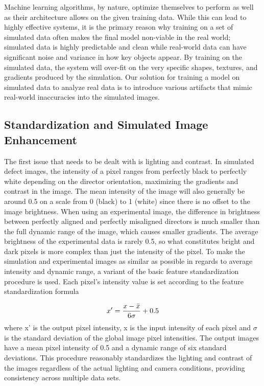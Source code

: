 \documentclass[prl,reprint,showpacs,floatfix,nofootinbib]{revtex4-1}
\begin{document}
Machine learning algorithms, by nature, optimize themselves to perform as well as their architecture allows on the given training data. While this can lead to highly effective systems, it is the primary reason why training on a set of simulated data often makes the final model non-viable in the real world; simulated data is highly predictable and clean while real-world data can have significant noise and variance in how key objects appear. By training on the simulated data, the system will over-fit\cite{lawrence_lessons_1997} \cite{lever_model_2016} on the very specific shapes, textures, and gradients produced by the simulation. %
Our solution for training a model on simulated data to analyze real data is to introduce various artifacts that mimic real-world inaccuracies into the simulated images.

\subsection{Standardization and Simulated Image Enhancement}

The first issue that needs to be dealt with is lighting and contrast. In simulated defect images, the intensity of a pixel ranges from perfectly black to perfectly white depending on the director orientation, maximizing the gradients and contrast in the image. The mean intensity of the image will also generally be around 0.5 on a scale from 0 (black) to 1 (white) since there is no offset to the image brightness. When using an experimental image, the difference in brightness between perfectly aligned and perfectly misaligned directors is much smaller than the full dynamic range of the image, which causes smaller gradients. The average brightness of the experimental data is rarely 0.5, so what constitutes bright and dark pixels is more complex than just the intensity of the pixel. To make the simulation and experimental images as similar as possible in regards to average intensity and dynamic range, a variant of the basic feature standardization procedure\cite{aksoy_feature_2001} is used. Each pixel's intensity value is set according to the feature standardization formula

\begin{equation}
 x' = \frac{x - \Bar{x}}{6\sigma} +0.5
\end{equation}
where x' is the output pixel intensity, x is the input intensity of each pixel and $\sigma$ is the standard deviation of the global image pixel intensities. The output images have a mean pixel intensity of 0.5 and a dynamic range of six standard deviations. This procedure reasonably standardizes the lighting and contrast of the images regardless of the actual lighting and camera conditions, providing consistency across multiple data sets.
\end{document}
